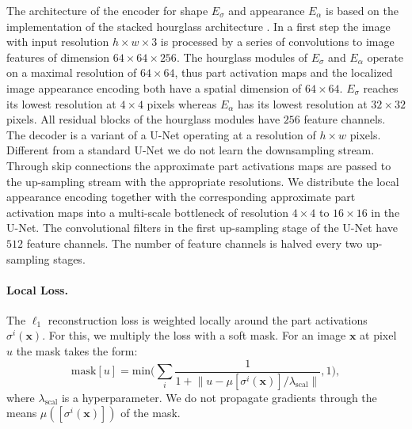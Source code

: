	The architecture of the encoder for shape $E_{\sigma}$ and appearance $E_{\alpha}$ is based on the implementation %
	of the stacked hourglass architecture \cite{newell16hourglass}.
	In a first step the image with input resolution $h \times w \times 3$ is processed by a series of convolutions to image features of dimension $64 \times 64 \times 256$.
	The hourglass modules of $E_{\sigma}$ and $E_{\alpha}$ operate on a maximal resolution of $64 \times 64$, thus part activation maps and the localized image appearance encoding both have a spatial dimension of $64 \times 64$.
	$E_{\sigma}$ reaches its lowest resolution at $4 \times 4$ pixels whereas $E_{\alpha}$ has its lowest resolution at $32 \times 32$ pixels.
	All residual blocks of the hourglass modules have $256$ feature channels.
	The decoder is a variant of a U-Net \cite{ronneberger15unet} operating at a resolution of $h \times w$ pixels.
	Different from a standard U-Net we do not learn the downsampling stream.
	Through skip connections the approximate part activations maps are passed to the up-sampling stream with the appropriate resolutions.
	We distribute the local appearance encoding together with the corresponding approximate part activation maps into a multi-scale bottleneck of resolution $4 \times 4$ to $16 \times 16$ in the U-Net.
	The convolutional filters in the first up-sampling stage of the U-Net have $512$ feature channels.
	The number of feature channels is halved every two up-sampling stages.
	\\
\paragraph{Local Loss.}
	The $\ell_1$ reconstruction loss is weighted locally around the part activations $\sigma^i(\mathbf{x})$. For this, we multiply the loss with a soft mask. %
	For an image $\mathbf{x}$ at pixel $u$ the mask takes the form:
	\begin{equation}
		\textrm{mask}[u] = \text{min}\big(\sum_i  \frac{1}{1 + \lVert u -  \mu[\sigma^i(\mathbf{x})]/\lambda_\text{scal} \rVert}, 1\big),
	\end{equation}
	where $\lambda_\text{scal}$ is a hyperparameter.
	We do not propagate gradients through the means $\mu([\sigma^i(\mathbf{x})])$ of the mask.\\





